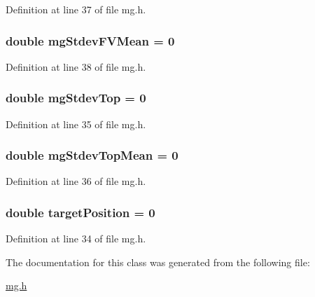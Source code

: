 Definition at line 37 of file mg.\+h.

\subsubsection[{\texorpdfstring{mg\+Stdev\+F\+V\+Mean}{mgStdevFVMean}}]{\setlength{\rightskip}{0pt plus 5cm}double mg\+Stdev\+F\+V\+Mean = 0}\hypertarget{class_k_1_1_m_g_a020f609af7e4ab045b64ca49a8db4f44}{}\label{class_k_1_1_m_g_a020f609af7e4ab045b64ca49a8db4f44}


Definition at line 38 of file mg.\+h.

\subsubsection[{\texorpdfstring{mg\+Stdev\+Top}{mgStdevTop}}]{\setlength{\rightskip}{0pt plus 5cm}double mg\+Stdev\+Top = 0}\hypertarget{class_k_1_1_m_g_ac4451d8294cb8944c256971e1acb775b}{}\label{class_k_1_1_m_g_ac4451d8294cb8944c256971e1acb775b}


Definition at line 35 of file mg.\+h.

\subsubsection[{\texorpdfstring{mg\+Stdev\+Top\+Mean}{mgStdevTopMean}}]{\setlength{\rightskip}{0pt plus 5cm}double mg\+Stdev\+Top\+Mean = 0}\hypertarget{class_k_1_1_m_g_abf4a6e034d5cf8359ada9f8344b0f469}{}\label{class_k_1_1_m_g_abf4a6e034d5cf8359ada9f8344b0f469}


Definition at line 36 of file mg.\+h.

\subsubsection[{\texorpdfstring{target\+Position}{targetPosition}}]{\setlength{\rightskip}{0pt plus 5cm}double target\+Position = 0}\hypertarget{class_k_1_1_m_g_a413889c063d487f39908c7c777096aa1}{}\label{class_k_1_1_m_g_a413889c063d487f39908c7c777096aa1}


Definition at line 34 of file mg.\+h.



The documentation for this class was generated from the following file\+:\begin{DoxyCompactItemize}
\item 
\hyperlink{mg_8h}{mg.\+h}\end{DoxyCompactItemize}
